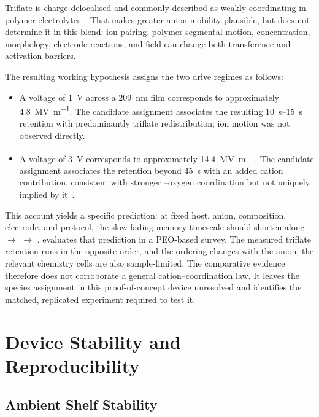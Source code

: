 \documentclass[12pt, twoside]{report}
\begin{document}
Triflate is charge-delocalised and commonly described as weakly coordinating in polymer electrolytes~\cite{BruceVincent1993,Frech1999PEOLiTf}. That makes greater anion mobility plausible, but does not determine it in this blend: ion pairing, polymer segmental motion, concentration, morphology, electrode reactions, and field can change both transference and activation barriers.

The resulting working hypothesis assigns the two drive regimes as follows:

\begin{itemize}
  \item A voltage of \SI{1}{\volt} across a \SI{209}{\nano\metre} film corresponds to approximately \SI{4.8}{\mega\volt\per\metre}. The candidate assignment associates the resulting \SIrange{10}{15}{\second} retention with predominantly triflate redistribution; ion motion was not observed directly.

  \item A voltage of \SI{3}{\volt} corresponds to approximately \SI{14.4}{\mega\volt\per\metre}. The candidate assignment associates the retention beyond \SI{45}{\second} with an added cation contribution, consistent with stronger --oxygen coordination but not uniquely implied by it~\cite{Lightfoot1993,BruceVincent1993}.
\end{itemize}

This account yields a specific prediction: at fixed host, anion, composition, electrode, and protocol, the slow fading-memory timescale should shorten along  \(\to\)  \(\to\) .  evaluates that prediction in a PEO-based survey. The measured triflate retention runs in the opposite order, and the ordering changes with the anion; the relevant chemistry cells are also sample-limited. The comparative evidence therefore does not corroborate a general cation--coordination law. It leaves the species assignment in this proof-of-concept device unresolved and identifies the matched, replicated experiment required to test it.


\section{Device Stability and Reproducibility}\label{sec:stability}

\subsection{Ambient Shelf Stability}\label{subsec:lifetime}
\end{document}

